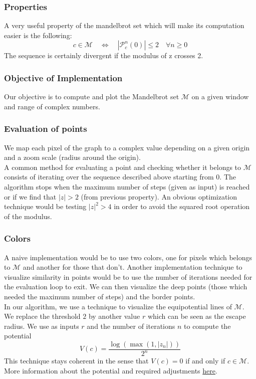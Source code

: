\documentclass[10pt,a4paper]{article}
\begin{document}
\subsubsection{Properties}
A very useful property of the mandelbrot set which will make its computation easier is the following:
$$c \in \mathcal{M} \quad \Longleftrightarrow \quad |\mathcal{P}^n_c(0)| \leq 2 \quad \forall n\geq 0$$
The sequence is certainly divergent if the modulus of z crosses 2.

\subsubsection{Objective of Implementation}
Our objective is to compute and plot the Mandelbrot set $\mathcal{M}$ on a given window and range of complex numbers. 

\subsubsection{Evaluation of points}
We map each pixel of the graph to a complex value depending on a given origin and a zoom scale (radius around the origin).\\
A common method for evaluating a point and checking whether it belongs to $\mathcal{M}$ consists of iterating over the sequence described above starting from $0$. The algorithm stops when the maximum number of steps (given as input) is reached or if we find that $|z| > 2$ (from previous property). An obvious optimization technique would be testing $|z|^2 > 4$ in order to avoid the squared root operation of the modulus.

\subsubsection{Colors}
A naive implementation would be to use two colors, one for pixels which belongs to $\mathcal{M}$ and another for those that don't. Another implementation technique to visualize similarity in points would be to use the number of iterations needed for the evaluation loop to exit. We can then visualize the deep points (those which needed the maximum number of steps) and the border points.\\
In our algorithm, we use a technique to visualize the equipotential lines of $\mathcal{M}$.\\
We replace the threshold $2$ by another value $r$ which can be seen as the escape radius. We use as inputs $r$ and the number of iterations $n$ to compute the potential $$V(c) = \frac{\log (\max (1, |z_n|))}{2^n}$$
This technique stays coherent in the sense that $V(c) = 0$ if and only if $c \in \mathcal{M}$. More information about the potential and required adjustments \href{https://www.math.univ-toulouse.fr/~cheritat/wiki-draw/index.php/Mandelbrot_set#The_potential}{\color{blue}here}.
\end{document}
